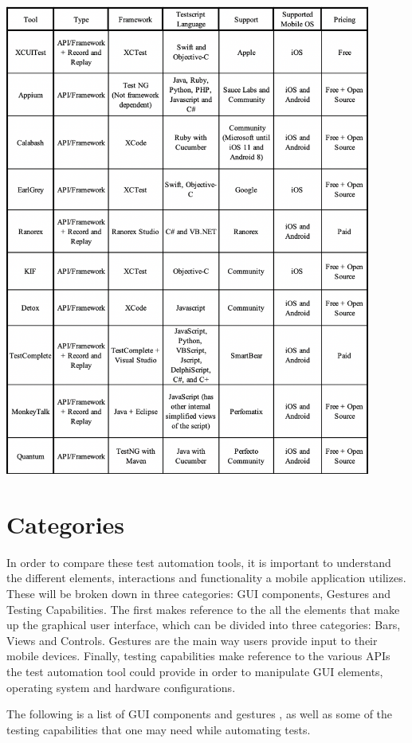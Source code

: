 \includegraphics[width=12cm]{img/table1.png} \\[0mm]

\section{Categories}
In order to compare these test automation tools, it is important to understand the different elements, interactions and functionality a mobile application utilizes. These will be broken down in three categories: GUI components, Gestures and Testing Capabilities. The first makes reference to the all the elements that make up the graphical user interface, which can be divided into three categories: Bars, Views and Controls. Gestures are the main way users provide input to their mobile devices. Finally, testing capabilities make reference to the various APIs the test automation tool could provide in order to manipulate GUI elements, operating system and hardware configurations.

The following is a list of GUI components and gestures \cite{AppleHumanInterface}, as well as some of the testing capabilities that one may need while automating tests.

